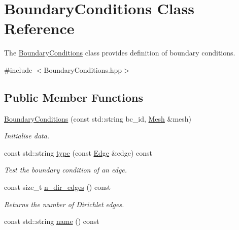 \hypertarget{classBoundaryConditions}{}\section{Boundary\+Conditions Class Reference}
\label{classBoundaryConditions}


The \hyperlink{classBoundaryConditions}{Boundary\+Conditions} class provides definition of boundary conditions.  




{\ttfamily \#include $<$Boundary\+Conditions.\+hpp$>$}

\subsection*{Public Member Functions}
\begin{DoxyCompactItemize}
\item 
\hyperlink{classBoundaryConditions_a5f9b50ca35f0fcee51e84e015223396c}{Boundary\+Conditions} (const std\+::string bc\+\_\+id, \hyperlink{classHArDCore2D_1_1Mesh}{Mesh} \&mesh)
\begin{DoxyCompactList}\small\item\em Initialise data. \end{DoxyCompactList}\item 
const std\+::string \hyperlink{classBoundaryConditions_abaeb77c2484042f248639f1806fe8e72}{type} (const \hyperlink{classHArDCore2D_1_1Edge}{Edge} \&edge) const
\begin{DoxyCompactList}\small\item\em Test the boundary condition of an edge. \end{DoxyCompactList}\item 
\mbox{\label{classBoundaryConditions_ad3c69b47183027c427ff6404875da645}} 
const size\+\_\+t \hyperlink{classBoundaryConditions_ad3c69b47183027c427ff6404875da645}{n\+\_\+dir\+\_\+edges} () const
\begin{DoxyCompactList}\small\item\em Returns the number of Dirichlet edges. \end{DoxyCompactList}\item 
\mbox{\label{classBoundaryConditions_ac3609733d5e7e43e9240d0a8b05d17ba}} 
const std\+::string \hyperlink{classBoundaryConditions_ac3609733d5e7e43e9240d0a8b05d17ba}{name} () const

\end{DoxyCompactItemize}
